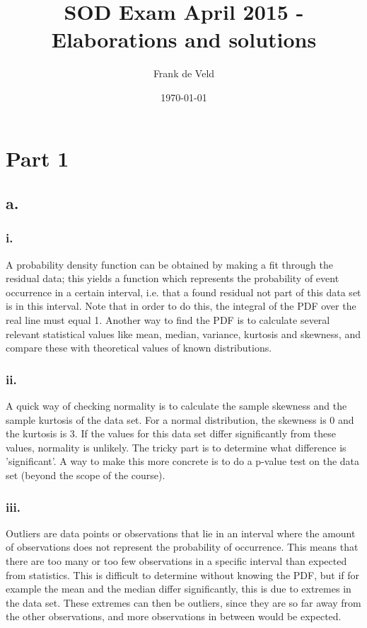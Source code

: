 \documentclass[a4paper,10pt,titlepage]{article}
\title{SOD Exam April 2015 - Elaborations and solutions}
\author{Frank de Veld}
\date{\today}
\begin{document}
\maketitle

\section{Part 1}
\subsection*{a.}
\subsubsection*{i.}
A probability density function can be obtained by making a fit through the residual data; this yields a function which represents the probability of event occurrence in a certain interval, i.e. that a found residual not part of this data set is in this interval. Note that in order to do this, the integral of the PDF over the real line must equal 1. Another way to find the PDF is to calculate several relevant statistical values like mean, median, variance, kurtosis and skewness, and compare these with theoretical values of known distributions.
\subsubsection*{ii.}
A quick way of checking normality is to calculate the sample skewness and the sample kurtosis of the data set. For a normal distribution, the skewness is 0 and the kurtosis is 3. If the values for this data set differ significantly from these values, normality is unlikely. The tricky part is to determine what difference is 'significant'. A way to make this more concrete is to do a p-value test on the data set (beyond the scope of the course).
\subsubsection*{iii.}
Outliers are data points or observations that lie in an interval where the amount of observations does not represent the probability of occurrence.  This means that there are too many or too few observations in a specific interval than expected from statistics. This is difficult to determine without knowing the PDF, but if for example the mean and the median differ significantly, this is due to extremes in the data set. These extremes can then be outliers, since they are so far away from the other observations, and more observations in between would be expected.
\end{document}
